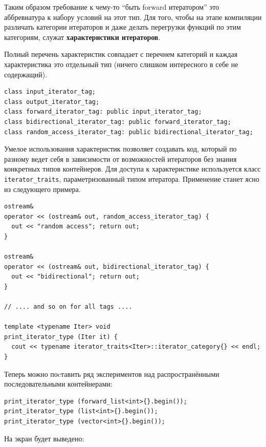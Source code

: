 \documentclass[a4paper,12pt,oneside]{book}
\newif\ifmoderncpp
\begin{document}
Таким образом требование к чему-то ``быть forward итератором'' это аббревиатура к набору условий на этот тип. Для того, чтобы на этапе компиляции различать категории итераторов и даже делать перегрузки функций по этим категориям, служат \textbf{характеристики итераторов}. 

\ifmoderncpp
Техника характеристик типов уже была описана в (\ref{sub:traits}). По сути здесь она просто применяется к итераторам.
\fi

Полный перечень характеристик совпадает с перечнем категорий и каждая характеристика это отдельный тип (ничего слишком интересного в себе не содержащий).

\begin{lstlisting}
class input_iterator_tag;
class output_iterator_tag;
class forward_iterator_tag: public input_iterator_tag;
class bidirectional_iterator_tag: public forward_iterator_tag;
class random_access_iterator_tag: public bidirectional_iterator_tag;
\end{lstlisting}

Умелое использования характеристик позволяет создавать код, который по разному ведет себя в зависимости от возможностей итераторов без знания конкретных типов контейнеров. Для доступа к характеристике используется класс \lstinline!iterator_traits!, параметризованный типом итератора. Применение станет ясно из следующего примера.

\begin{lstlisting}
ostream& 
operator << (ostream& out, random_access_iterator_tag) { 
  out << "random access"; return out; 
}

ostream& 
operator << (ostream& out, bidirectional_iterator_tag) { 
  out << "bidirectional"; return out; 
}

// .... and so on for all tags ....

template <typename Iter> void 
print_iterator_type (Iter it) {
  cout << typename iterator_traits<Iter>::iterator_category{} << endl;
}
\end{lstlisting}

Теперь можно поcтавить ряд экспериментов над распространёнными последовательными контейнерами:

\begin{lstlisting}
print_iterator_type (forward_list<int>{}.begin()); 
print_iterator_type (list<int>{}.begin());
print_iterator_type (vector<int>{}.begin());
\end{lstlisting}

На экран будет выведено:
\end{document}
